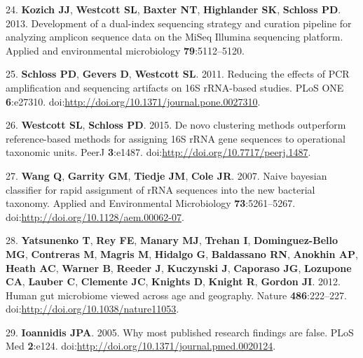 \documentclass[12pt,]{article}
\begin{document}
24. \textbf{Kozich JJ}, \textbf{Westcott SL}, \textbf{Baxter NT},
\textbf{Highlander SK}, \textbf{Schloss PD}. 2013. Development of a
dual-index sequencing strategy and curation pipeline for analyzing
amplicon sequence data on the MiSeq Illumina sequencing platform.
Applied and environmental microbiology \textbf{79}:5112--5120.

25. \textbf{Schloss PD}, \textbf{Gevers D}, \textbf{Westcott SL}. 2011.
Reducing the effects of PCR amplification and sequencing artifacts on
16S rRNA-based studies. PLoS ONE \textbf{6}:e27310.
doi:\url{http://doi.org/10.1371/journal.pone.0027310}.

26. \textbf{Westcott SL}, \textbf{Schloss PD}. 2015. De novo clustering
methods outperform reference-based methods for assigning 16S rRNA gene
sequences to operational taxonomic units. PeerJ \textbf{3}:e1487.
doi:\url{http://doi.org/10.7717/peerj.1487}.

27. \textbf{Wang Q}, \textbf{Garrity GM}, \textbf{Tiedje JM},
\textbf{Cole JR}. 2007. Naive bayesian classifier for rapid assignment
of rRNA sequences into the new bacterial taxonomy. Applied and
Environmental Microbiology \textbf{73}:5261--5267.
doi:\url{http://doi.org/10.1128/aem.00062-07}.

28. \textbf{Yatsunenko T}, \textbf{Rey FE}, \textbf{Manary MJ},
\textbf{Trehan I}, \textbf{Dominguez-Bello MG}, \textbf{Contreras M},
\textbf{Magris M}, \textbf{Hidalgo G}, \textbf{Baldassano RN},
\textbf{Anokhin AP}, \textbf{Heath AC}, \textbf{Warner B},
\textbf{Reeder J}, \textbf{Kuczynski J}, \textbf{Caporaso JG},
\textbf{Lozupone CA}, \textbf{Lauber C}, \textbf{Clemente JC},
\textbf{Knights D}, \textbf{Knight R}, \textbf{Gordon JI}. 2012. Human
gut microbiome viewed across age and geography. Nature
\textbf{486}:222--227. doi:\url{http://doi.org/10.1038/nature11053}.

29. \textbf{Ioannidis JPA}. 2005. Why most published research findings
are false. PLoS Med \textbf{2}:e124.
doi:\url{http://doi.org/10.1371/journal.pmed.0020124}.
\end{document}
